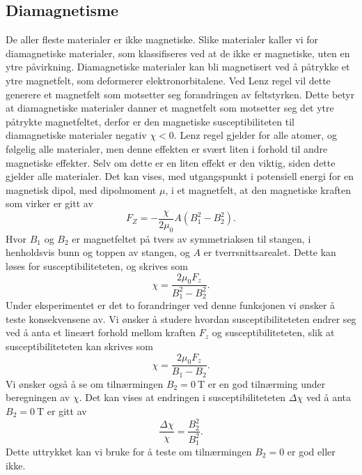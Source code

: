 \documentclass[%
 reprint,
 amsmath,amssymb,
 aps,
 norsk,
]{revtex4-1}
\begin{document}
\subsection{Diamagnetisme}
De aller fleste materialer er ikke magnetiske. Slike materialer kaller vi for diamagnetiske materialer, som klassifiseres ved at de ikke er magnetiske, uten en ytre påvirkning. Diamagnetiske materialer kan bli magnetisert ved å påtrykke et ytre magnetfelt, som deformerer elektronorbitalene. Ved Lenz regel vil dette generere et magnetfelt som motsetter seg forandringen av feltstyrken. Dette betyr at diamagnetiske materialer danner et magnetfelt som motsetter seg det ytre påtrykte magnetfeltet, derfor er den magnetiske susceptibiliteten til diamagnetiske materialer negativ $\chi < 0$. Lenz regel gjelder for alle atomer, og følgelig alle materialer, men denne effekten er svært liten i forhold til andre magnetiske effekter. Selv om dette er en liten effekt er den viktig, siden dette gjelder alle materialer. Det kan vises, med utgangspunkt i potensiell energi for en magnetisk dipol, med dipolmoment $\mu$, i et magnetfelt, at den magnetiske kraften som virker er gitt av
\begin{equation}
  F_Z = -\frac{\chi}{2\mu_0}A\left(B_1^2 - B_2^2\right). \label{vismut}
\end{equation}
Hvor $B_1$ og $B_2$ er magnetfeltet på tvers av symmetriaksen til stangen, i henholdsvis bunn og toppen av stangen, og $A$ er tverrsnittsarealet. Dette kan løses for susceptibiliteteten, og skrives som
\begin{equation}
  \chi = \frac{2\mu_0F_z}{B_1^2 - B_2^2}.
\end{equation}
Under eksperimentet er det to forandringer ved denne funksjonen vi ønsker å teste konsekvensene av. Vi ønsker å studere hvordan susceptibiliteteten endrer seg ved å anta et lineært forhold mellom kraften $F_z$ og susceptibiliteteten, slik at susceptibiliteteten kan skrives som
\begin{equation}
  \chi = \frac{2\mu_0F_z}{B_1 - B_2}.\label{lin_chi}
\end{equation}
Vi ønsker også å se om tilnærmingen $B_2=\SI{0}{\tesla}$ er en god tilnærming under beregningen av $\chi$. Det kan vises at endringen i susceptibiliteteten $\Delta \chi$ ved å anta $B_2=\SI{0}{\tesla}$ er gitt av
\begin{equation}
  \frac{\Delta \chi}{\chi} = \frac{B_2^2}{B_1^2}. \label{test_chi}
\end{equation}
Dette uttrykket kan vi bruke for å teste om tilnærmingen $B_2=0$ er god eller ikke.
\end{document}
